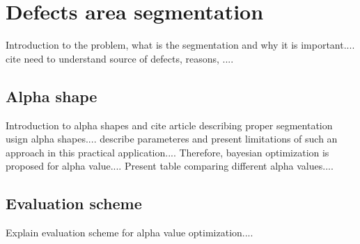 \section{Defects area segmentation}
    Introduction to the problem, what is the segmentation and why it is important.... cite need to understand source of defects, reasons, ....

    \subsection{Alpha shape}
        Introduction to alpha shapes and cite article describing proper segmentation usign alpha shapes.... describe parameteres and present limitations of such an approach in this practical application....
        Therefore, bayesian optimization is proposed for alpha value....
        Present table comparing different alpha values....

    \subsection{Evaluation scheme}
        Explain evaluation scheme for alpha value optimization....
    


